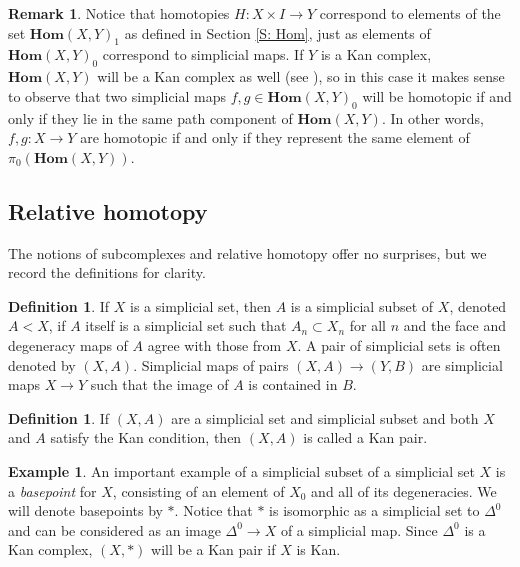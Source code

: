 \documentclass[12pt]{article}
\theoremstyle{plain}
\theoremstyle{definition}
\newtheorem{definition}[theorem]{Definition}
\newtheorem{remark}[theorem]{Remark}
\newtheorem{example}[theorem]{Example}
\newcommand{\Homs}{\textbf{Hom}}
\begin{document}
\begin{remark}
Notice that homotopies $H\colon X\times I\to Y$ correspond to elements of the set $\Homs(X,Y)_1$ as defined in Section \ref{S: Hom}, just as elements of $\Homs(X,Y)_0$ correspond to simplicial maps. If $Y$ is a Kan complex, $\Homs(X,Y)$ will be a Kan complex as well (see \cite[Theorem 1.6.9]{MAY67}), so 
in this case it makes sense to observe that two simplicial maps $f,g\in \Homs(X,Y)_0$ will be  homotopic if and only if they lie in the same path component of $\Homs(X,Y)$. In other words, $f,g:X\to Y$ are homotopic if and only if they represent the same element of $\pi_0(\Homs(X,Y))$.
\end{remark}





\subsection{Relative homotopy}\label{S: relative homotopy}

The notions of subcomplexes and relative homotopy offer no surprises, but we record the definitions for clarity.

\begin{definition}
If $X$ is a simplicial set, then $A$ is a simplicial subset of $X$, denoted $A<X$, if $A$ itself is a simplicial set such that $A_n\subset X_n$ for all $n$ and the face and degeneracy maps of $A$ agree with those from $X$. A pair of simplicial sets is often denoted by $(X,A)$. 
Simplicial maps of pairs $(X,A)\to (Y,B)$ are simplicial maps $X\to Y$  such that the image of $A$ is contained in $B$.
\end{definition}

\begin{definition}
If $(X,A)$ are a simplicial set and simplicial subset and both $X$ and $A$ satisfy the Kan condition, then $(X,A)$ is called a Kan pair.
\end{definition}

\begin{example}
An important example of a simplicial subset of a simplicial set $X$ is a \emph{basepoint} for $X$, consisting of an element of $X_0$ and all of its degeneracies. We will denote basepoints by $*$. Notice that $*$ is isomorphic as a simplicial set to $\Delta^0$ and can be considered as an image $\Delta^0\to X$ of a simplicial map. Since $\Delta^0$ is a Kan complex, $(X,*)$ will be a Kan pair if $X$ is Kan. 
\end{example}
\end{document}
